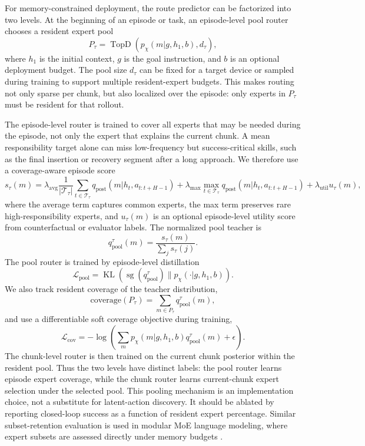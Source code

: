 \documentclass[10pt]{article}
\newcommand{\sg}{\operatorname{sg}}
\newcommand{\TopD}{\operatorname{TopD}}
\newcommand{\KL}{\operatorname{KL}}
\begin{document}
For memory-constrained deployment, the route predictor can be factorized into two levels. At the beginning of an episode or task, an episode-level pool router chooses a resident expert pool
\begin{equation}
P_\tau=\TopD(p_\chi(m|g,h_1,b),d_\tau),
\label{eq:pool_router}
\end{equation}
where $h_1$ is the initial context, $g$ is the goal instruction, and $b$ is an optional deployment budget. The pool size $d_\tau$ can be fixed for a target device or sampled during training to support multiple resident-expert budgets. This makes routing not only sparse per chunk, but also localized over the episode: only experts in $P_\tau$ must be resident for that rollout.

The episode-level router is trained to cover all experts that may be needed during the episode, not only the expert that explains the current chunk. A mean responsibility target alone can miss low-frequency but success-critical skills, such as the final insertion or recovery segment after a long approach. We therefore use a coverage-aware episode score
\begin{equation}
s_\tau(m)=
\lambda_{\mathrm{avg}}\frac{1}{|\mathcal{T}_\tau|}
\sum_{t\in\mathcal{T}_\tau}q_{\mathrm{post}}(m|h_t,a_{t:t+H-1})
+\lambda_{\mathrm{max}}\max_{t\in\mathcal{T}_\tau}q_{\mathrm{post}}(m|h_t,a_{t:t+H-1})
+\lambda_{\mathrm{util}}u_\tau(m),
\end{equation}
where the average term captures common experts, the max term preserves rare high-responsibility experts, and $u_\tau(m)$ is an optional episode-level utility score from counterfactual or evaluator labels. The normalized pool teacher is
\begin{equation}
q_{\mathrm{pool}}^\tau(m)=\frac{s_\tau(m)}{\sum_j s_\tau(j)}.
\end{equation}
The pool router is trained by episode-level distillation
\begin{equation}
\mathcal{L}_{\mathrm{pool}}=\KL\left(\sg(q_{\mathrm{pool}}^\tau)\|p_\chi(\cdot|g,h_1,b)\right).
\end{equation}
We also track resident coverage of the teacher distribution,
\begin{equation}
\mathrm{coverage}(P_\tau)=\sum_{m\in P_\tau}q_{\mathrm{pool}}^\tau(m),
\end{equation}
and use a differentiable soft coverage objective during training,
\begin{equation}
\mathcal{L}_{\mathrm{cov}}=-\log\left(\sum_m p_\chi(m|g,h_1,b)q_{\mathrm{pool}}^\tau(m)+\epsilon\right).
\end{equation}
The chunk-level router is then trained on the current chunk posterior within the resident pool. Thus the two levels have distinct labels: the pool router learns episode expert coverage, while the chunk router learns current-chunk expert selection under the selected pool.
This pooling mechanism is an implementation choice, not a substitute for latent-action discovery. It should be ablated by reporting closed-loop success as a function of resident expert percentage. Similar subset-retention evaluation is used in modular MoE language modeling, where expert subsets are assessed directly under memory budgets \cite{wang2026emo}.
\end{document}
